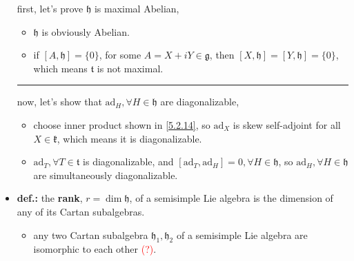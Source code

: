 \begin{itemize}
	\begin{tcolorbox}[title=proof:]
		first, let's prove $\mathfrak{h}$ is maximal Abelian,
		\begin{itemize}
			\item $\mathfrak{h}$ is obviously Abelian.
			
			\item if $[A, \mathfrak{h}] = \{0\}$, for some $A = X + i Y \in \mathfrak{g}$, then $[X, \mathfrak{h}] = [Y, \mathfrak{h}] = \{0\}$, which means $\mathfrak{t}$ is not maximal.
		\end{itemize}
		
		\noindent\rule[0.5ex]{\linewidth}{0.5pt} %
		
		now, let's show that $\mathrm{ad}_H, \forall H \in \mathfrak{h}$ are diagonalizable,
		\begin{itemize}
			\item choose inner product shown in \eqref{5.2.14}, so $\mathrm{ad}_X$ is skew self-adjoint for all $X \in \mathfrak{k}$, which means it is diagonalizable.
			
			\item $\mathrm{ad}_T, \forall T \in \mathfrak{t}$ is diagonalizable, and $[\mathrm{ad}_T, \mathrm{ad}_{H}] = 0, \forall H \in \mathfrak{h}$, so $\mathrm{ad}_H, \forall H \in \mathfrak{h}$ are simultaneously diagonalizable.
		\end{itemize}
	\end{tcolorbox}
	
	\item \textbf{def.:} the \textbf{rank}, $r = \dim \mathfrak{h}$, of a semisimple Lie algebra is the dimension of any of its Cartan subalgebras.
	\begin{itemize}
		\item any two Cartan subalgebra $\mathfrak{h}_1, \mathfrak{h}_2$ of a semisimple Lie algebra are isomorphic to each other \textcolor{red}{(?)}.
	\end{itemize}
\end{itemize}

